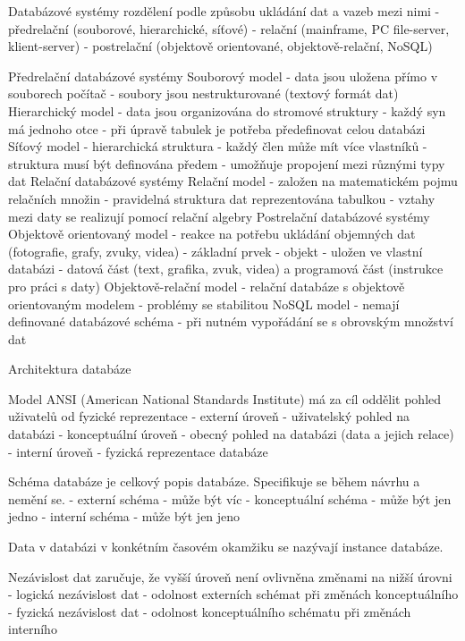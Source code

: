 \documentclass[11pt,a4paper]{book}   %
\begin{document}
Databázové systémy
rozdělení podle způsobu ukládání dat a vazeb mezi nimi
- předrelační (souborové, hierarchické, síťové)
- relační (mainframe, PC file-server, klient-server)
- postrelační (objektově orientované, objektově-relační, NoSQL)

  Předrelační databázové systémy
    Souborový model
    - data jsou uložena přímo v souborech počítač
    - soubory jsou nestrukturované (textový formát dat)
    Hierarchický model
    - data jsou organizována do stromové struktury
      - každý syn má jednoho otce
    - při úpravě tabulek je potřeba předefinovat celou databázi
    Síťový model
    - hierarchická struktura
      - každý člen může mít více vlastníků
    - struktura musí být definována předem
    - umožňuje propojení mezi různými typy dat
 Relační databázové systémy
  Relační model
  - založen na matematickém pojmu relačních množin
    - pravidelná struktura dat reprezentována tabulkou
    - vztahy mezi daty se realizují pomocí relační algebry
Postrelační databázové systémy
  Objektově orientovaný model
  - reakce na potřebu ukládání objemných dat (fotografie, grafy, zvuky, videa)
  - základní prvek - objekt
    - uložen ve vlastní databázi
    - datová část (text, grafika, zvuk, videa) a programová část (instrukce pro práci s daty)
  Objektově-relační model
  - relační databáze s objektově orientovaným modelem
  - problémy se stabilitou
  NoSQL model
  - nemají definované databázové schéma
  - při nutném vypořádání se s obrovským množství dat


Architektura databáze

Model ANSI (American National Standards Institute) má za cíl oddělit pohled uživatelů od fyzické reprezentace
  - externí úroveň - uživatelský pohled na databázi
  - konceptuální úroveň - obecný pohled na databázi (data a jejich relace)
  - interní úroveň - fyzická reprezentace databáze
  
  Schéma databáze je celkový popis databáze. Specifikuje se během návrhu a nemění se.
  - externí schéma - může být víc
  - konceptuální schéma - může být jen jedno
  - interní schéma - může být jen jeno
  
 Data v databázi v konkétním časovém okamžiku se nazývají instance databáze.
 
 Nezávislost dat zaručuje, že vyšší úroveň není ovlivněna změnami na nižší úrovni
 - logická nezávislost dat - odolnost externích schémat při změnách konceptuálního
 - fyzická nezávislost dat - odolnost konceptuálního schématu při změnách interního 
\end{document}

